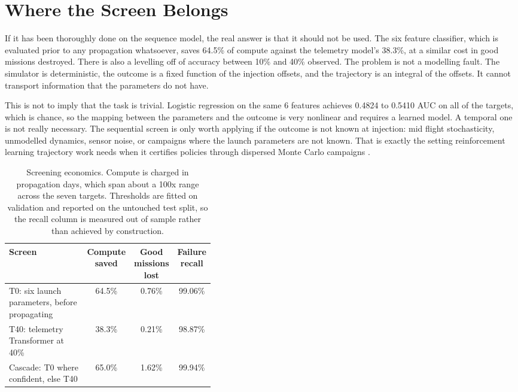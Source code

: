 \documentclass[preprint,12pt,authoryear]{elsarticle}
\begin{document}
\section{Where the Screen Belongs}
\label{sec:screen}

If it has been thoroughly done on the sequence model, the real answer is that it should not be used. The six feature classifier, which is evaluated prior to any propagation whatsoever, saves 64.5\% of compute against the telemetry model's 38.3\%, at a similar cost in good missions destroyed. There is also a levelling off of accuracy between 10\% and 40\% observed. The problem is not a modelling fault. The simulator is deterministic, the outcome is a fixed function of the injection offsets, and the trajectory is an integral of the offsets. It cannot transport information that the parameters do not have.

This is not to imply that the task is trivial. Logistic regression on the same 6 features achieves 0.4824 to 0.5410 AUC on all of the targets, which is chance, so the mapping between the parameters and the outcome is very nonlinear and requires a learned model. A temporal one is not really necessary. The sequential screen is only worth applying if the outcome is not known at injection: mid flight stochasticity, unmodelled dynamics, sensor noise, or campaigns where the launch parameters are not known. That is exactly the setting reinforcement learning trajectory work needs when it certifies policies through dispersed Monte Carlo campaigns \citep{zavoli2021}.

\begin{table}[t]
\centering
\caption{Screening economics. Compute is charged in propagation days, which span about a 100x range across the seven targets. Thresholds are fitted on validation and reported on the untouched test split, so the recall column is measured out of sample rather than achieved by construction.}
\label{tab:economics}
\footnotesize
\setlength{\tabcolsep}{4pt}
\begin{tabular}{@{}p{0.40\linewidth}ccc@{}}
\toprule
Screen & Compute saved & Good missions lost & Failure recall \\
\midrule
T0: six launch parameters, before propagating & 64.5\% & 0.76\% & 99.06\% \\
T40: telemetry Transformer at 40\% & 38.3\% & 0.21\% & 98.87\% \\
Cascade: T0 where confident, else T40 & 65.0\% & 1.62\% & 99.94\% \\
\bottomrule
\end{tabular}
\end{table}
\end{document}
